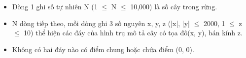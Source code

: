 \begin{itemize}
	\item Dòng 1 ghi số tự nhiên N (1  $\le$  N  $\le$  10,000) là số cây trong rừng.
	\item N dòng tiếp theo, mỗi dòng ghi 3 số nguyên x, y, z (|x|, |y|  $\le$  2000, 1  $\le$  z  $\le$  10) thể hiện các đáy của hình trụ mô tả cây có tọa đô(x, y), bán kính z.
	\item Không có hai đáy nào có điểm chung hoặc chứa điểm (0, 0).
\end{itemize}

\